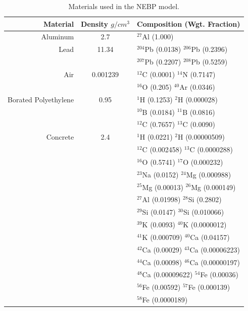 
\begin{table}[h]\centering
\label{tab:nebp_materials}
\caption{Materials used in the NEBP model.}
\begin{tabular}{ r c l }
\toprule
\textbf{Material} & \textbf{Density} $g/cm^3$ & \textbf{Composition (Wgt. Fraction)} \\
\midrule
Aluminum & 2.7 & $^{27}$Al (1.000) \\
\midrule
Lead & 11.34 & $^{204}$Pb (0.0138)  $^{206}$Pb (0.2396) \\
        & & $^{207}$Pb (0.2207)  $^{208}$Pb (0.5259) \\
\midrule
Air & 0.001239 & $^{12}$C (0.0001)  $^{14}$N (0.7147) \\
        & & $^{16}$O (0.205)  $^{40}$Ar (0.0346) \\
\midrule
Borated Polyethylene & 0.95 & $^{1}$H (0.1253)  $^{2}$H (0.000028) \\
                       &  & $^{10}$B (0.0184)   $^{11}$B (0.0816) \\
                       &  & $^{12}$C (0.7657)   $^{13}$C (0.0090) \\
\midrule
Concrete & 2.4 &  $^{1}$H (0.0221) $^{2}$H (0.00000509) \\
& &         $^{12}$C (0.002458)  $^{13}$C (0.0000288) \\
& &           $^{16}$O (0.5741)  $^{17}$O (0.000232) \\
& &          $^{23}$Na (0.0152)   $^{24}$Mg (0.000988) \\
& &          $^{25}$Mg (0.00013)   $^{26}$Mg (0.000149) \\
& &          $^{27}$Al (0.01998)   $^{28}$Si (0.2802) \\
& &          $^{29}$Si (0.0147)  $^{30}$Si (0.010066) \\
& &          $^{39}$K (0.0093)   $^{40}$K (0.0000012) \\
& &          $^{41}$K (0.000709)  $^{40}$Ca (0.04157) \\
& &          $^{42}$Ca (0.00029)    $^{43}$Ca (0.00006223) \\
& &          $^{44}$Ca (0.00098)   $^{46}$Ca (0.00000197) \\
& &          $^{48}$Ca (0.00009622)    $^{54}$Fe (0.00036) \\
& &          $^{56}$Fe (0.00592)   $^{57}$Fe (0.000139) \\
& &          $^{58}$Fe (0.0000189) \\

\end{tabular}
\end{table}
